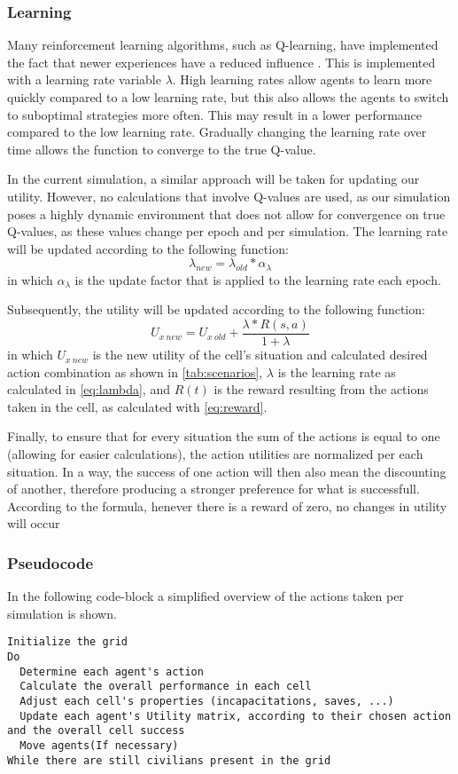 \subsubsection{Learning}
Many reinforcement learning algorithms, such as Q-learning, have implemented the fact that newer experiences have a reduced influence  \citep*{watkins1992q}.
This is implemented with a learning rate variable $\lambda$.
High learning rates allow agents to learn more quickly compared to a low learning rate, but this also allows the agents to switch to suboptimal strategies more often.
This may result in a lower performance compared to the low learning rate.
Gradually changing the learning rate over time allows the function to converge to the true Q-value.

In the current simulation, a similar approach will be taken for updating our utility.
However, no calculations that involve Q-values are used,
as our simulation poses a highly dynamic environment that does not allow for convergence on true Q-values,
as these values change per epoch and per simulation.
The learning rate will be updated according to the following function:
\begin{equation} \label{eq:lambda}
\lambda_{new} = \lambda_{old} * \alpha_{\lambda}
\end{equation}
in which $\alpha_\lambda$ is the update factor that is applied to the learning rate each epoch.

Subsequently, the utility will be updated according to the following function:
\begin{equation} \label{eq:utility}
U_{x~new} = U_{x~old} + \frac{\lambda * R(s,a)}{1+\lambda}
\end{equation}
in which $U_{x~new}$ is the new utility of the cell's  situation and calculated desired action combination as shown in \autoref{tab:scenarios},
$\lambda$ is the learning rate as calculated in \autoref{eq:lambda}, and $R(t)$ is the reward resulting from the actions taken in the cell, as calculated with \autoref{eq:reward}.

Finally, to ensure that for every situation the sum of the actions is equal to one (allowing for easier calculations), 
the action utilities are normalized per each situation.
In a way, the success of one action will then also mean the discounting of another, therefore producing a stronger preference for what is successfull.
According to the formula, henever there is a reward of zero, no changes in utility will occur

\subsubsection{Pseudocode}
In the following code-block a simplified overview of the actions taken per simulation is shown.
\begin{lstlisting}
Initialize the grid
Do
  Determine each agent's action 
  Calculate the overall performance in each cell
  Adjust each cell's properties (incapacitations, saves, ...)
  Update each agent's Utility matrix, according to their chosen action and the overall cell success
  Move agents(If necessary)
While there are still civilians present in the grid
\end{lstlisting}

